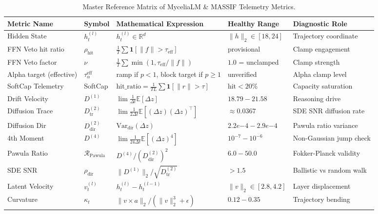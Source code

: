 \documentclass[11pt,a4paper]{article}
\begin{document}
\begin{longtable}{p{2.5cm} p{1.9cm} p{4.7cm} p{2.5cm} p{2.9cm}}
\caption{Master Reference Matrix of MyceliaLM \& MASSIF Telemetry Metrics.} \label{tab:master_matrix} \\
\toprule
\textbf{Metric Name} & \textbf{Symbol} & \textbf{Mathematical Expression} & \textbf{Healthy Range} & \textbf{Diagnostic Role} \\
\midrule
\endhead
\bottomrule
\endfoot

Hidden State & $h^{(l)}_t$ & $h^{(l)}_t \in \mathbb{R}^d$ & $\|h\|_2 \in [18, 24]$ & Trajectory coordinate \\
FFN Veto hit ratio & $\rho_{\text{hit}}$ & $\frac{1}{T}\sum\mathbf{1}[\|f\|>\tau_{\text{eff}}]$ & provisional & Clamp engagement \\
FFN Veto factor & $\nu$ & $\frac{1}{T}\sum\min(1,\tau_{\text{eff}}/\|f\|)$ & $1.0$ = unclamped & Clamp strength \\
Alpha target (effective) & $\tau_\alpha^{\text{eff}}$ & ramp if $p<1$, block target if $p\ge1$ & unverified & Alpha clamp level \\
SoftCap Telemetry & SoftCap & $\text{hit\_ratio} = \frac{1}{TL}\sum \mathbf{1}[\|r\|>\tau]$ & $\text{hit} < 20\%$ & Capacity saturation \\
Drift Velocity & $D^{(1)}$ & $\lim \frac{1}{\Delta t} \mathbb{E}[\Delta z]$ & $18.79 - 21.58$ & Reasoning drive \\
Diffusion Trace & $D^{(2)}_{\text{tr}}$ & $\lim \frac{1}{2\Delta t} \mathbb{E}[(\Delta z)(\Delta z)^\top]$ & $\approx 0.0367$ & SDE SNR diffusion rate \\
Diffusion Dir & $D^{(2)}_{\text{dir}}$ & $\text{Var}_{\text{dir}}(\Delta z)$ & $2.2e{-4} - 2.9e{-4}$ & Pawula ratio variance \\
4th Moment & $D^{(4)}$ & $\lim \frac{1}{24\Delta t} \mathbb{E}[(\Delta z)^4]$ & $10^{-7} - 10^{-6}$ & Non-Gaussian jump check \\
Pawula Ratio & $\mathcal{R}_{\text{Pawula}}$ & $D^{(4)} / (D^{(2)}_{\text{dir}})^2$ & $6.0 - 50.0$ & Fokker-Planck validity \\
SDE SNR & $\rho_{\text{dir}}$ & $\|D^{(1)}\|_2 / \sqrt{D^{(2)}_{\text{tr}}}$ & $> 1.5$ & Ballistic vs random walk \\
Latent Velocity & $v^{(l)}_t$ & $h^{(l)}_t - h^{(l-1)}_t$ & $\|v\|_2 \in [2.8, 4.2]$ & Layer displacement \\
Curvature & $\kappa_t$ & $\|v \times a\|_2 / (\|v\|_2^3 + \epsilon)$ & $0.12 - 0.35$ & Trajectory bending \\

\end{longtable}
\end{document}
